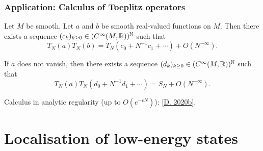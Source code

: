 \documentclass[mathserif]{beamer}
\newcommand{\mycite}[1]{{\color{mygreen} \small #1}}
\begin{document}
  \begin{frame}
    \frametitle{Application: Calculus of Toeplitz operators}

    \begin{theorem}[{\mycite{[Schlichenmaier 1999]}}]Let $M$ be smooth. Let $a$ and $b$ be
      smooth real-valued functions on $M$. Then there exists a sequence $(c_k)_{k\geq
        0}\in (C^{\infty}(M,\mathbb{R}))^{\mathbb{N}}$ such that
      \[
        T_N(a)T_N(b)=T_N(c_0+N^{-1}c_1+\cdots)+O(N^{-\infty}).
        \]

        If $a$ does not vanish, then there exists a sequence
        $(d_k)_{k\geq 0}\in (C^{\infty}(M,\mathbb{R}))^{\mathbb{N}}$ such that
        \[
          T_N(a)T_N(d_0+N^{-1}d_1+\cdots)=S_N+O(N^{-\infty}).
          \]
        \end{theorem}

        \vfill
        
        Calculus in analytic regularity (up to $O(e^{-cN})$):
        \mycite{[\underline{D. 2020b}]}.
  \end{frame}


\section{Localisation of low-energy states}
\end{document}

